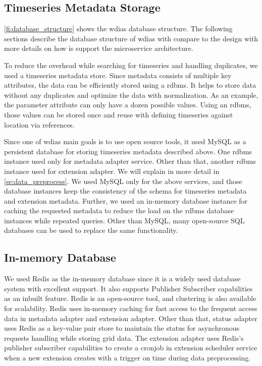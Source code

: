 \subsection{Timeseries Metadata Storage}
\label{subse:mysql}

\cref{fi:database_structure} shows the \acrshort{wdias} database structure.
The following sections describe the database structure of \acrshort{wdias} with compare to the design with more details on how is support the microservice architecture.

To reduce the overhead while searching for timeseries and handling duplicates, we used a timeseries metadata store. Since metadata consists of multiple key attributes, the data can be efficiently stored using a \acrfull{rdbms}. It helps to store data without any duplicates and optimize the data with normalization. As an example, the parameter attribute can only have a dozen possible values. Using an \acrshort{rdbms}, those values can be stored once and reuse with defining timeseries against location via references.

Since one of \acrshort{wdias} main goals is to use open source tools, it used MySQL as a persistent database for storing timeseries metadata described above. One \acrshort{rdbms} instance used only for metadata adapter service. Other than that, another \acrshort{rdbms} instance used for extension adapter. We will explain in more detail in \cref{se:data_preprocess}. We used MySQL only for the above services, and those database instances keep the consistency of the schema for timeseries metadata and extension metadata. Further, we used an in-memory database instance for caching the requested metadata to reduce the load on the \acrshort{rdbms} database instances while repeated queries. Other than MySQL, many open-source SQL databases can be used to replace the same functionality.

\subsection{In-memory Database}
\label{subse:redis}

We used Redis \cite{RedisRedisDocumentation} as the in-memory database since it is a widely used database system with excellent support. It also supports Publisher Subscriber capabilities as an inbuilt feature. Redis is an open-source tool, and clustering is also available for scalability. Redis uses in-memory caching for fast access to the frequent access data in metadata adapter and extension adapter. Other than that, status adapter uses Redis as a key-value pair store to maintain the status for asynchronous requests handling while storing grid data. The extension adapter uses Redis's publisher subscriber capabilities to create a cronjob in extension scheduler service when a new extension creates with a trigger on time during data preprocessing.

